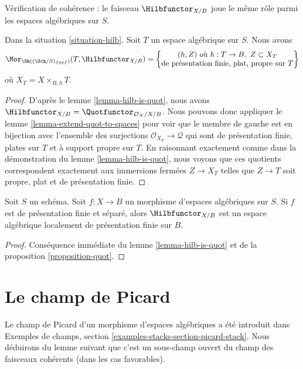 \noindent
Vérification de cohérence : le faisceau $\Hilbfunctor_{X/B}$ joue le même rôle
parmi les espaces algébriques sur $S$.

\begin{lemma}
\label{lemma-extend-hilb-to-spaces}
Dans la situation \ref{situation-hilb}. Soit $T$ un espace algébrique sur $S$.
Nous avons
$$
\Mor_{\Sh((\Sch/S)_{fppf})}(T, \Hilbfunctor_{X/B}) =
\left\{
\begin{matrix}
(h, Z)\text{ où }h : T \to B,\ Z \subset X_T \\
\text{de présentation finie, plat, propre sur }T
\end{matrix}
\right\}
$$
où $X_T = X \times_{B, h} T$.
\end{lemma}

\begin{proof}
D'après le lemme \ref{lemma-hilb-is-quot}, nous avons
$\Hilbfunctor_{X/B} = \Quotfunctor_{\mathcal{O}_X/X/B}$. Nous pouvons donc
appliquer le lemme \ref{lemma-extend-quot-to-spaces} pour voir que le membre de
gauche est en bijection avec l'ensemble des surjections
$\mathcal{O}_{X_T} \to \mathcal{Q}$ qui sont de présentation finie, plates
sur $T$ et à support propre sur $T$. En raisonnant exactement comme dans la
démonstration du lemme \ref{lemma-hilb-is-quot}, nous voyons que ces quotients
correspondent exactement aux immersions fermées $Z \to X_T$ telles que
$Z \to T$ soit propre, plat et de présentation finie.
\end{proof}

\begin{proposition}
\label{proposition-hilb}
Soit $S$ un schéma. Soit $f : X \to B$ un morphisme d'espaces algébriques sur
$S$. Si $f$ est de présentation finie et séparé, alors
$\Hilbfunctor_{X/B}$ est un espace algébrique localement de présentation finie
sur $B$.
\end{proposition}

\begin{proof}
Conséquence immédiate du lemme \ref{lemma-hilb-is-quot} et de la proposition
\ref{proposition-quot}.
\end{proof}






\section{Le champ de Picard}
\label{section-picard-stack}

\noindent
Le champ de Picard d'un morphisme d'espaces algébriques a été introduit dans
Exemples de champs, section \ref{examples-stacks-section-picard-stack}. Nous
déduirons du lemme suivant que c'est un sous-champ ouvert du champ des faisceaux
cohérents (dans les cas favorables).

